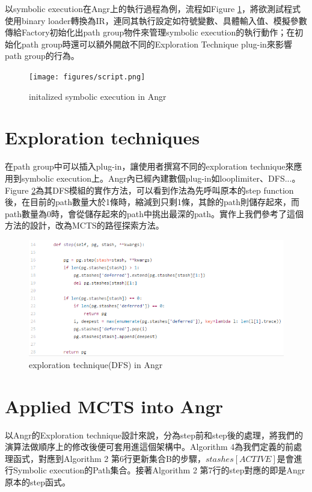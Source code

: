 \documentclass[12pt,a4paper,oneside]{book}
\begin{document}
以symbolic execution在Angr上的執行過程為例，流程如Figure \ref{figAngrScript}，將欲測試程式使用binary loader轉換為IR，連同其執行設定如符號變數、具體輸入值、模擬參數傳給Factory初始化出path group物件來管理symbolic execution的執行動作；在初始化path group時還可以額外開啟不同的Exploration Technique plug-in來影響path group的行為。

\begin{figure}[htbp]
\center
\texttt{[image: figures/script.png]}
\caption{initalized symbolic execution in Angr \label{figAngrScript}}
\end{figure}

\section{Exploration techniques}

在path group中可以插入plug-in，讓使用者撰寫不同的exploration technique來應用到symbolic execution上。Angr內已經內建數個plug-in如looplimiter、DFS...。Figure \ref{figExptech}為其DFS模組的實作方法，可以看到作法為先呼叫原本的step function後，在目前的path數量大於1條時，縮減到只剩1條，其餘的path則儲存起來，而path數量為0時，會從儲存起來的path中挑出最深的path。實作上我們參考了這個方法的設計，改為MCTS的路徑探索方法。

\begin{figure}[htbp]
\center
\includegraphics[]{figures/exptech.png}
\caption{exploration technique(DFS) in Angr \label{figExptech}}
\end{figure}

\section{Applied MCTS into Angr}

以Angr的Exploration technique設計來說，分為step前和step後的處理，將我們的演算法做順序上的修改後便可套用進這個架構中。Algorithm 4為我們定義的前處理函式，對應到Algorithm 2 第6行更新集合B的步驟，$stashes[ACTIVE]$是會進行Symbolic execution的Path集合。接著Algorithm 2 第7行的step對應的即是Angr原本的step函式。
\end{document}
